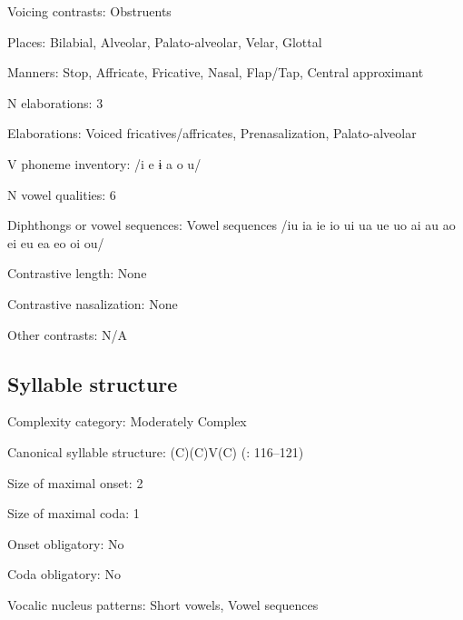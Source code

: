 {\begin{appendixdesc}
\item[Voicing contrasts:] Obstruents

\item[Places:] Bilabial, Alveolar, Palato-alveolar, Velar, Glottal

\item[Manners:] Stop, Affricate, Fricative, Nasal, Flap/Tap, Central approximant

\item[N elaborations:] 3

\item[Elaborations:] Voiced fricatives/affricates, Prenasalization, Palato-alveolar

\item[V phoneme inventory:] /i e ɨ a o u/

\item[N vowel qualities:] 6

\item[Diphthongs or vowel sequences:] Vowel sequences /iu ia ie io ui ua ue uo ai au ao ei eu ea eo oi ou/

\item[Contrastive length:] None

\item[Contrastive nasalization:] None

\item[Other contrasts:] N/A
\end{appendixdesc}
\subsection*{Syllable structure}
\begin{appendixdesc}

\item[Complexity category:] Moderately Complex

\item[Canonical syllable structure:] (C)(C)V(C) (\citealt{SandersSanders1980}: 116--121)

\item[Size of maximal onset:] 2

\item[Size of maximal coda:] 1

\item[Onset obligatory:] No

\item[Coda obligatory:] No

\item[Vocalic nucleus patterns:] Short vowels, Vowel sequences


\end{appendixdesc}}
